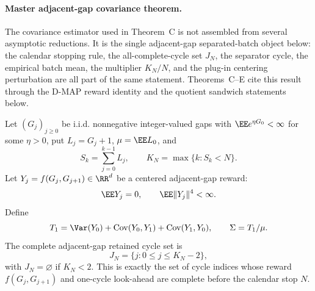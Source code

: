 \paragraph{Master adjacent-gap covariance theorem.}
The covariance estimator used in Theorem~C is not assembled from several
asymptotic reductions.  It is the single adjacent-gap separated-batch object
below: the calendar stopping rule, the all-complete-cycle set \(J_N\), the
separator cycle, the empirical batch mean, the multiplier \(K_N/N\), and the
plug-in centering perturbation are all part of the same statement.
Theorems~C--E cite this result through the D-MAP reward identity and the
quotient sandwich statements below.

\begin{theorem}\label{thm:main-calendar-stopped-separated-batch-plugin}
Let \((G_j)_{j\ge0}\) be i.i.d. nonnegative integer-valued gaps with
\(\EE e^{\eta G_0}<\infty\) for some \(\eta>0\), put \(L_j=G_j+1\),
\(\mu=\EE L_0\), and
\[
S_k=\sum_{j=0}^{k-1}L_j,\qquad
K_N=\max\{k:S_k<N\}.
\]
Let \(Y_j=f(G_j,G_{j+1})\in\RR^d\) be a centered adjacent-gap reward:
\[
\EE Y_j=0,\qquad \EE\|Y_j\|^4<\infty .
\]
Define
\[
T_1=\Var(Y_0)+\operatorname{Cov}(Y_0,Y_1)
     +\operatorname{Cov}(Y_1,Y_0),
\qquad
\Sigma=T_1/\mu .
\]
The complete adjacent-gap retained cycle set is
\[
J_N=\{j:0\le j\le K_N-2\},
\]
with \(J_N=\varnothing\) if \(K_N<2\).  This is exactly the set of cycle
indices whose reward \(f(G_j,G_{j+1})\) and one-cycle look-ahead are complete
before the calendar stop \(N\).


\end{theorem}
